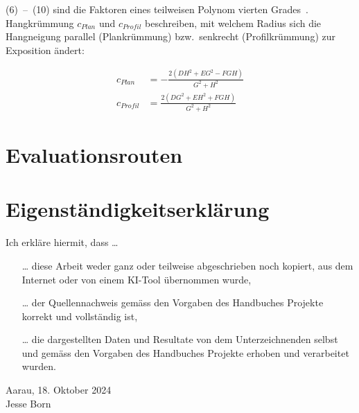 (6)~--~(10) sind die Faktoren eines teilweisen Polynom vierten Grades~\cite{gismath}.
Hangkrümmung $c_{Plan}$ und $c_{Profil}$ beschreiben, mit welchem Radius sich die Hangneigung parallel (Plankrümmung) bzw.\ senkrecht (Profilkrümmung) zur Exposition ändert:

\begin{align}
    c_{Plan} &= -\frac{{2(DH^2 + EG^2 - FGH)}}{{G^2 + H^2}}
    \\
    c_{Profil} &= \frac{{2(DG^2 + EH^2 + FGH)}}{{G^2 + H^2}}
\end{align}

\section{Evaluationsrouten}\label{app:evalroutes}









\section{Eigenständigkeitserklärung}
Ich erkläre hiermit, dass \ldots
\begin{itemize}
  \item[\ldots] diese Arbeit weder ganz oder teilweise abgeschrieben noch kopiert, aus dem Internet oder von einem KI-Tool übernommen wurde,
  \item[\ldots] der Quellennachweis gemäss den Vorgaben des Handbuches Projekte korrekt und vollständig ist,
  \item[\ldots] die dargestellten Daten und Resultate von dem Unterzeichnenden selbst und gemäss den Vorgaben des Handbuches Projekte erhoben und verarbeitet wurden.
\end{itemize}

\noindent
Aarau, 18. Oktober 2024\\

\noindent
Jesse Born



